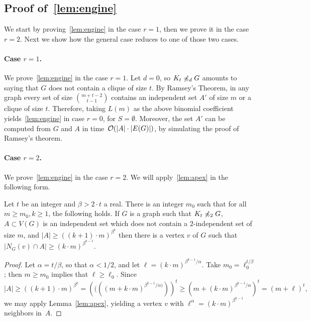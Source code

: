 \subsection{Proof of~\cref{lem:engine}}
\label{sec:engine}

We start by proving~\cref{lem:engine} in the case $r=1$,
then we prove it in the case $r=2$. Next we show how the general case reduces to one of those two cases.

\paragraph{Case $r=1$.}
We prove~\cref{lem:engine} in the case $r=1$.
Let $d=0$, so $K_t\not\preccurlyeq_d G$ amounts to saying that $G$
does not contain a clique of size $t$. By Ramsey's Theorem, in any graph every set of size $\binom{m+t-2}{t-1}$ contains an
independent set $A'$ of size $m$ or a clique of size $t$. Therefore, 
taking $L(m)$ as the above binomial coefficient yields~\cref{lem:engine} in case $r=0$, for $S=\emptyset$. Moreover, the set $A'$ can be computed from $G$ and $A$
in time~$\mathcal{O}(|A|\cdot |E(G)|)$, by simulating the proof of Ramsey's theorem.

\paragraph{Case $r=2$.}
We prove~\cref{lem:engine} in the case $r=2$. 
We will apply~\cref{lem:apex} in the following form.
\begin{corollary}\label{cor:apex}
	Let $t$ be an integer and $\beta>2\cdot t$ a real. 
	There is an integer $m_0$ such that for all $m\ge m_0,k\ge 1$, the following holds.
	If $G$ is a graph such that $K_t\not\preccurlyeq_2 G$,
	$A\subset V(G)$ is an independent set which does not contain a $2$-independent set of size $m$, and $|A|\ge ((k+1)\cdot m)^{\beta ^k}$
	then there is a vertex $v$ of $G$ such that $|N_G(v)\cap A| \ge (k\cdot m)^{\beta^{k-1}}$.
\end{corollary}
\begin{proof}
Let $\alpha=t/\beta$, so that $\alpha<1/2$, 
 and let 
$\ell=(k\cdot m)^{\beta^{k-1}/\alpha}$.
Take $m_0= \ell_0^{t/\beta}$; then $m\ge m_0$ implies that $\ell\ge\ell_0$.
Since
$$|A|\ge \left((k+1)\cdot m\right)^{\beta^k}=\left ((((m+ k\cdot m)^{\beta^{k-1}/\alpha)}) \right)^t
\ge (m+(k\cdot m)^{\beta^{k-1}/\alpha})^t=(m+\ell)^t,$$
we may  apply Lemma~\ref{lem:apex},
yielding a vertex $v$ with $\ell^\alpha=(k\cdot m)^{\beta^{k-1}}$ neighbors in~$A$.
\end{proof}

